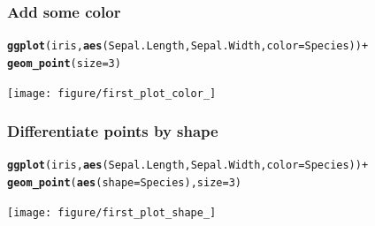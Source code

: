 \documentclass{beamer}\usepackage[]{graphicx}\usepackage[]{color}
\makeatletter
\newcommand{\hlkwd}[1]{\textcolor[rgb]{0.737,0.353,0.396}{\textbf{#1}}}%
\newenvironment{kframe}{%
 \def\at@end@of@kframe{}%
 \ifinner\ifhmode%
  \def\at@end@of@kframe{\end{minipage}}%
  \begin{minipage}{\columnwidth}%
 \fi\fi%
 \def\FrameCommand##1{\hskip\@totalleftmargin \hskip-\fboxsep
 \colorbox{shadecolor}{##1}\hskip-\fboxsep
     \hskip-\linewidth \hskip-\@totalleftmargin \hskip\columnwidth}%
 \MakeFramed {\advance\hsize-\width
   \@totalleftmargin\z@ \linewidth\hsize
   \@setminipage}}%
 {\par\unskip\endMakeFramed%
 \at@end@of@kframe}
\newenvironment{knitrout}{}{} %
\makeatother
\begin{document}

\begin{frame}[fragile]
\frametitle{Add some color}
\begin{knitrout}\footnotesize
{}\color{fgcolor}\begin{kframe}
\begin{alltt}
\hlkwd{ggplot}(iris, \hlkwd{aes}(Sepal.Length, Sepal.Width, color = Species)) +
\hlkwd{geom_point}(size = 3)
\end{alltt}
\end{kframe}

{\centering \texttt{[image: figure/first\_plot\_color\_]} 

}



\end{knitrout}

\end{frame}


\begin{frame}[fragile]
\frametitle{Differentiate points by shape}
\begin{knitrout}\footnotesize
{}\color{fgcolor}\begin{kframe}
\begin{alltt}
\hlkwd{ggplot}(iris, \hlkwd{aes}(Sepal.Length, Sepal.Width, color = Species)) +
\hlkwd{geom_point}(\hlkwd{aes}(shape = Species), size = 3)
\end{alltt}
\end{kframe}

{\centering \texttt{[image: figure/first\_plot\_shape\_]} 

}



\end{knitrout}

\end{frame}

\end{document}
